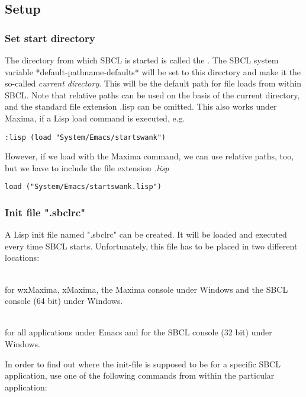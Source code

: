 \documentclass[../Maxima_Workbook.tex]{subfiles}
\begin{document}
\subsection{Setup}

\subsubsection{Set start directory}\label{EE2a}

The directory from which SBCL is started is called the . The SBCL system variable *default-pathname-defaults* will be set to this directory and make it the so-called \emph{current directory}. This will be the default path for file loads from within SBCL. Note that relative paths can be used on the basis of the current directory, and the standard file extension .lisp can be omitted. This also works under Maxima, if a Lisp load command is executed, e.g.

\begin{lstlisting}[style=lisp]
:lisp (load "System/Emacs/startswank")
\end{lstlisting}

However, if we load with the Maxima command, we can use relative paths, too, but we have to include the file extension \emph{.lisp}

\begin{lstlisting}[style=lisp]
load ("System/Emacs/startswank.lisp")
\end{lstlisting}

\subsubsection{Init file ".sbclrc"}\label{EE2}

A Lisp init file named ".sbclrc" can be created. It will be loaded and executed every time SBCL starts. Unfortunately, this file has to be placed in two different locations:

\lz {} \\
for wxMaxima, xMaxima, the Maxima console under Windows and the SBCL console (64 bit) under Windows.

\lz {} \\
for all applications under Emacs and for the SBCL console (32 bit) under Windows.

\lz In order to find out where the init-file is supposed to be for a specific SBCL application, use one of the following commands from within the particular application:
\end{document}
